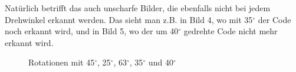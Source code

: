 Natürlich betrifft das auch unscharfe Bilder, die ebenfalls nicht bei jedem Drehwinkel erkannt werden. Das sieht man z.B. in Bild 4, wo mit 35$^\circ$ der Code noch erkannt wird, und in Bild 5, wo der um 40$^\circ$ gedrehte Code nicht mehr erkannt wird.
\begin{figure}[H]
  \centering
  \caption{Rotationen mit 45$^\circ$, 25$^\circ$, 63$^\circ$, 35$^\circ$ und 40$^\circ$}
  \label{fig:qrrotate}
\end{figure}

